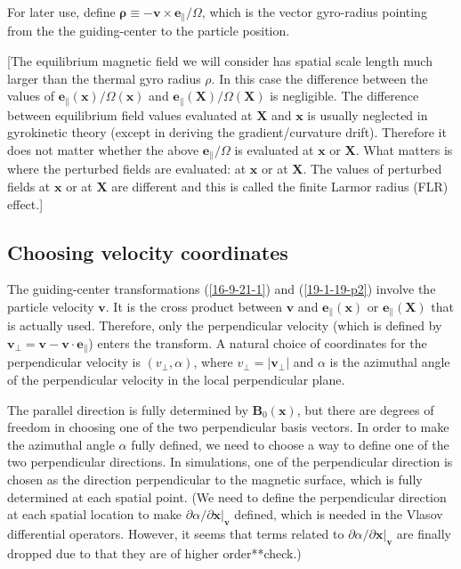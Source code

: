 \documentclass{article}
\newcommand{\nobracket}{}
\newcommand{\tmmathbf}[1]{\ensuremath{\boldsymbol{#1}}}
\newcommand{\tmtexttt}[1]{\text{{\ttfamily{#1}}}}
\begin{document}
For later use, define $\tmmathbf{\rho} \equiv -\mathbf{v} \times
\mathbf{e}_{\parallel} / \Omega$, which is the vector gyro-radius pointing
from the the guiding-center to the particle position.

[The equilibrium magnetic field we will consider has spatial scale length much
larger than the thermal gyro radius $\rho$. In this case the difference
between the values of $\mathbf{e}_{\parallel} (\mathbf{x}) / \Omega
(\mathbf{x})$ and $\mathbf{e}_{\parallel} (\mathbf{X}) / \Omega (\mathbf{X})$
is negligible. The difference between equilibrium field values evaluated at
$\mathbf{X}$ and $\mathbf{x}$ is usually neglected in gyrokinetic theory
(except in deriving the gradient/curvature drift). Therefore it does not
matter whether the above $\mathbf{e}_{\parallel} / \Omega$ is evaluated at
$\mathbf{x}$ or $\mathbf{X}$. What matters is where the perturbed fields are
evaluated: at $\mathbf{x}$ or at $\mathbf{X}$. The values of perturbed fields
at $\mathbf{x}$ or at $\mathbf{X}$ are different and this is called the finite
Larmor radius (FLR) effect.]

\subsection{Choosing velocity coordinates}

The guiding-center transformations (\ref{16-9-21-1}) and (\ref{19-1-19-p2})
involve the particle velocity $\mathbf{v}$. It is the cross product between
$\mathbf{v}$ and $\tmmathbf{e}_{\parallel} (\mathbf{x})$ or
$\tmmathbf{e}_{\parallel} (\mathbf{X})$ that is actually used. Therefore, only
the perpendicular velocity (which is defined by $\mathbf{v}_{\perp}
=\mathbf{v}-\mathbf{v} \cdot \mathbf{e}_{\parallel}$) enters the transform. A
natural choice of coordinates for the perpendicular velocity is $(v_{\perp},
\alpha)$, where $v_{\perp} = | \mathbf{v}_{\perp} |$ and $\alpha$ is the
azimuthal angle of the perpendicular velocity in the local perpendicular
plane.

The parallel direction is fully determined by $\mathbf{B}_0 (\mathbf{x})$, but
there are degrees of freedom in choosing one of the two perpendicular basis
vectors. In order to make the azimuthal angle $\alpha$ fully defined, we need
to choose a way to define one of the two perpendicular directions. In
\tmtexttt{GEM} simulations, one of the perpendicular direction is chosen as
the direction perpendicular to the magnetic surface, which is fully determined
at each spatial point. (We need to define the perpendicular direction at each
spatial location to make $\partial \alpha / \partial \mathbf{x} |_{\mathbf{v}}
\nobracket$ defined, which is needed in the Vlasov differential operators.
However, it seems that terms related to $\partial \alpha / \partial \mathbf{x}
|_{\mathbf{v}} \nobracket$ are finally dropped due to that they are of higher
order**check.)
\end{document}
